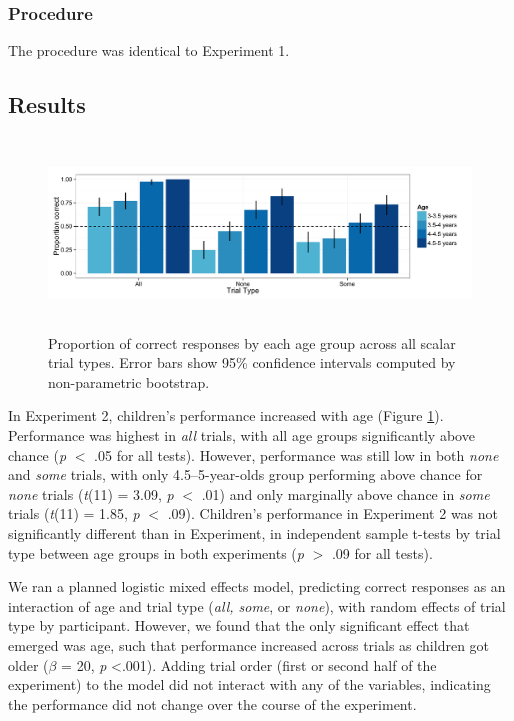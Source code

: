\documentclass[man]{apa2}
\begin{document}
\subsubsection{Procedure}
The procedure was identical to Experiment 1. 

\subsection{Results}

\begin{figure} 
 \begin{center} 
  \includegraphics[height=2in]{figures/exp2_performance.pdf} 
  \caption{\label{fig:exp2_perf} Proportion of correct responses by each age group across all scalar trial types.  Error bars show 95\% confidence intervals computed by non-parametric bootstrap.} 
 \end{center} 
\end{figure}

In Experiment 2, children's performance increased with age (Figure \ref{fig:exp2_perf}). Performance was highest in \textit{all} trials, with all age groups significantly above chance (\emph{p} $<$ .05 for all tests). However, performance was still low in both \textit{none} and \textit{some} trials, with only 4.5--5-year-olds group performing above chance for \textit{none} trials (\textit{t}(11) = 3.09, \textit{p} $<$ .01) and only marginally above chance in \textit{some} trials (\textit{t}(11) = 1.85, \textit{p} $<$ .09). Children's performance in Experiment 2 was not significantly different than in Experiment, in independent sample t-tests by trial type between age groups in both experiments (\emph{p} $>$ .09 for all tests). 

We ran a planned logistic mixed effects model, predicting correct responses as an interaction of age and trial type (\textit{all, some}, or \textit{none}), with random effects of trial type by participant. However, we found that the only significant effect that emerged was age, such that performance increased across trials as children got older ($\beta$ = 20, \textit{p} \textless  .001). Adding trial order (first or second half of the experiment) to the model did not interact with any of the variables, indicating the performance did not change over the course of the experiment. 
\end{document}
